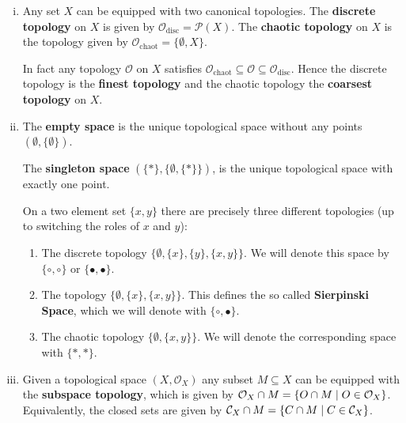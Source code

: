 \begin{example}\vspace{-1.5em}
	\begin{enumerate}[(i)]
		\item{
			Any set $X$ can be equipped with two canonical topologies. The \textbf{discrete topology} on $X$ is given by $\mathcal{O}_\text{disc} = \mathcal{P}(X)$. The \textbf{chaotic topology} on $X$ is the topology given by $\mathcal{O}_\text{chaot} = \{\emptyset, X\}$.

			In fact any topology $\mathcal{O}$ on $X$ satisfies $\mathcal{O}_\text{chaot} \subseteq \mathcal{O} \subseteq \mathcal{O}_\text{disc}$. Hence the discrete topology is the \textbf{finest topology} and the chaotic topology the \textbf{coarsest topology} on $X$.
		}
		\item{
			The \textbf{empty space} is the unique topological space without any points $(\emptyset,\{\emptyset\})$.

			The \textbf{singleton space} $(\{*\}, \{\emptyset,\{*\}\})$, is the unique topological space with exactly one point.

			On a two element set $\{x,y\}$ there are precisely three different topologies (up to switching the roles of $x$ and $y$):
			\begin{enumerate}[$\bullet$]
				\item{
					The discrete topology $\{\emptyset, \{x\}, \{y\}, \{x,y\}\}$. We will denote this space by $\{\circ, \circ\}$ or $\{\bullet, \bullet\}$.
				}
				\item{
					The topology $\{\emptyset, \{x\}, \{x,y\}\}$. This defines the so called \textbf{Sierpinski Space}, which we will denote with $\{\circ, \bullet\}$.
				}
				\item{
					The chaotic topology $\{\emptyset, \{x,y\}\}$. We will denote the corresponding space with $\{*, *\}$.
				}
			\end{enumerate}
		}
		\item{
			Given a topological space $(X,\mathcal{O}_X)$ any subset $M \subseteq X$ can be equipped with the \textbf{subspace topology}, which is given by $\mathcal{O}_X \cap M = \{O \cap M \mid O \in \mathcal{O}_X\}$. Equivalently, the closed sets are given by $\mathcal{C}_X \cap M = \{C \cap M \mid C \in \mathcal{C}_X\}$.
		}
	\end{enumerate}
\end{example}

 

